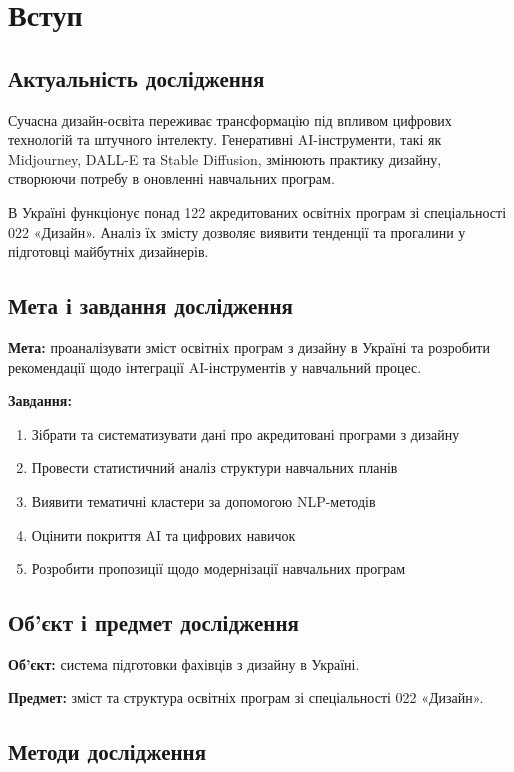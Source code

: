 \chapter{Вступ}

\section{Актуальність дослідження}

Сучасна дизайн-освіта переживає трансформацію під впливом цифрових технологій
та штучного інтелекту. Генеративні AI-інструменти, такі як Midjourney, DALL-E
та Stable Diffusion, змінюють практику дизайну, створюючи потребу в оновленні
навчальних програм.

В Україні функціонує понад 122 акредитованих освітніх програм
зі спеціальності 022 «Дизайн». Аналіз їх змісту дозволяє виявити тенденції
та прогалини у підготовці майбутніх дизайнерів.

\section{Мета і завдання дослідження}

\textbf{Мета:} проаналізувати зміст освітніх програм з дизайну в Україні
та розробити рекомендації щодо інтеграції AI-інструментів у навчальний процес.

\textbf{Завдання:}
\begin{enumerate}
    \item Зібрати та систематизувати дані про акредитовані програми з дизайну
    \item Провести статистичний аналіз структури навчальних планів
    \item Виявити тематичні кластери за допомогою NLP-методів
    \item Оцінити покриття AI та цифрових навичок
    \item Розробити пропозиції щодо модернізації навчальних програм
\end{enumerate}

\section{Об'єкт і предмет дослідження}

\textbf{Об'єкт:} система підготовки фахівців з дизайну в Україні.

\textbf{Предмет:} зміст та структура освітніх програм зі спеціальності 022 «Дизайн».

\section{Методи дослідження}


